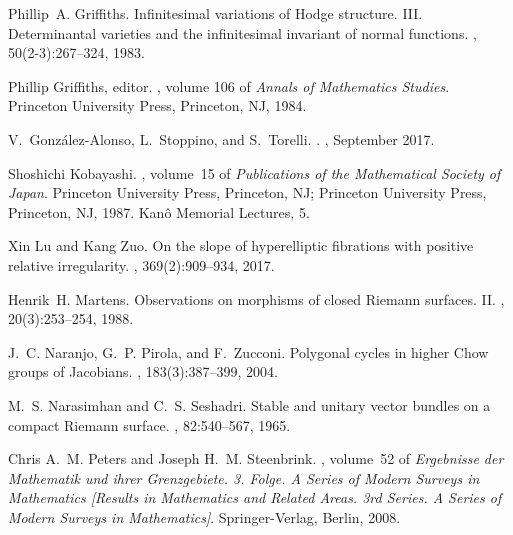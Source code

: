 \documentclass[a4paper,11pt]{amsart}
\begin{document}
{\begin{thebibliography}{CEZGT14}
		Phillip~A. Griffiths.
		\newblock Infinitesimal variations of {H}odge structure. {III}. {D}eterminantal
		varieties and the infinitesimal invariant of normal functions.
		, 50(2-3):267--324, 1983.
		
		Phillip Griffiths, editor.
		, volume 106 of {\em
			Annals of Mathematics Studies}. Princeton University Press, Princeton, NJ,
		1984.
		
		V.~{Gonz{\'a}lez-Alonso}, L.~{Stoppino}, and S.~{Torelli}.
		.
		, September 2017.
		
		Shoshichi Kobayashi.
		, volume~15 of
		{\em Publications of the Mathematical Society of Japan}.
		\newblock Princeton University Press, Princeton, NJ; Princeton University
		Press, Princeton, NJ, 1987.
		\newblock Kan\^o Memorial Lectures, 5.
		
		Xin Lu and Kang Zuo.
		\newblock On the slope of hyperelliptic fibrations with positive relative
		irregularity.
		, 369(2):909--934, 2017.
		
		Henrik~H. Martens.
		\newblock Observations on morphisms of closed {R}iemann surfaces. {II}.
		, 20(3):253--254, 1988.
		
		J.~C. Naranjo, G.~P. Pirola, and F.~Zucconi.
		\newblock Polygonal cycles in higher {C}how groups of {J}acobians.
		, 183(3):387--399, 2004.
		
		M.~S. Narasimhan and C.~S. Seshadri.
		\newblock Stable and unitary vector bundles on a compact {R}iemann surface.
		, 82:540--567, 1965.
		
		Chris A.~M. Peters and Joseph H.~M. Steenbrink.
		, volume~52 of {\em Ergebnisse der
			Mathematik und ihrer Grenzgebiete. 3. Folge. A Series of Modern Surveys in
			Mathematics [Results in Mathematics and Related Areas. 3rd Series. A Series
			of Modern Surveys in Mathematics]}.
		\newblock Springer-Verlag, Berlin, 2008.
		

\end{thebibliography}}
\end{document}
